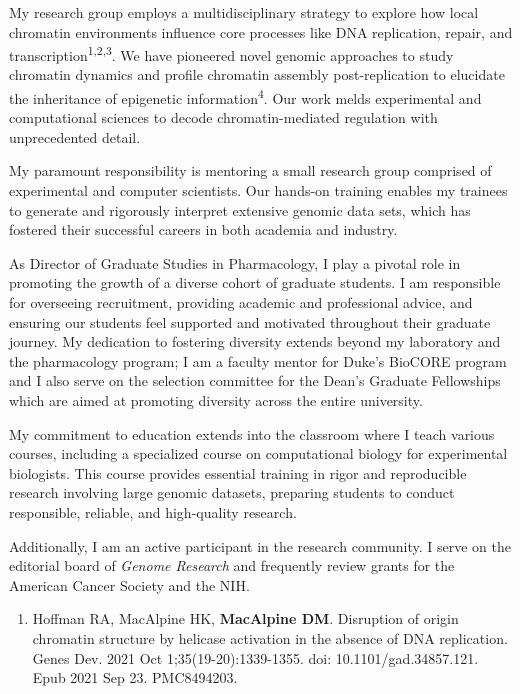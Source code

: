 \documentclass{nihbiosketch}
\begin{document}
\begin{statement}
\addtolength{\parskip}{1.5mm}
\noindent My research group employs a multidisciplinary strategy to explore how local chromatin environments influence core processes like DNA replication, repair, and transcription\textsuperscript{1,2,3}. We have pioneered novel genomic approaches to study chromatin dynamics and profile chromatin assembly post-replication to elucidate the inheritance of epigenetic information\textsuperscript{4}. Our work melds experimental and computational sciences to decode chromatin-mediated regulation with unprecedented detail.

\noindent My paramount responsibility is mentoring a small research group comprised of experimental and computer scientists. Our hands-on training enables my trainees to generate and rigorously interpret extensive genomic data sets, which has fostered their successful careers in both academia and industry.

\noindent As Director of Graduate Studies in Pharmacology, I play a pivotal role in promoting the growth of a diverse cohort of graduate students. I am responsible for overseeing recruitment, providing academic and professional advice, and ensuring our students feel supported and motivated throughout their graduate journey. My dedication to fostering diversity extends beyond my laboratory and the pharmacology program; I am a faculty mentor for Duke's  BioCORE program and I also serve on the selection committee for the Dean's Graduate Fellowships which are aimed at promoting diversity across the entire university.  

\noindent My commitment to education extends into the classroom where I teach various courses, including a specialized course on computational biology for experimental biologists. This course provides essential training in rigor and reproducible research involving large genomic datasets, preparing students to conduct responsible, reliable, and high-quality research.

\noindent Additionally, I am an active participant in the research community. I serve on the editorial board of \textit{Genome Research} and frequently review grants for the American Cancer Society and the NIH.  

\begin{enumerate}

\item Hoffman RA, MacAlpine HK, \textbf{MacAlpine DM}. Disruption of origin chromatin structure by helicase activation in the absence of DNA replication. Genes Dev. 2021 Oct 1;35(19-20):1339-1355. doi: 10.1101/gad.34857.121. Epub 2021 Sep 23. PMC8494203.


\end{enumerate}
\end{statement}
\end{document}
